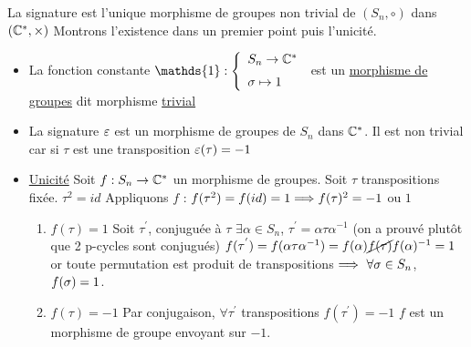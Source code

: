 \documentclass[11pt]{article}
\begin{document}
\begin{corr}{}{}
    La signature est l'unique morphisme de groupes non trivial de $(S_{n}, \circ)$ dans $(\mathbb{C}^{*}, \times)$
    \tcblower
    Montrons l'existence dans un premier point puis l'unicité.
    \begin{itemize}
        \item La fonction constante \n
        $\mathds{1} : \left\{ \begin{array}{ll}
             S_{n} \to \C^{*}  \n
             \s \mapsto 1
        \end{array}\right.$ est un \underline{morphisme de groupes} dit morphisme \underline{trivial}
        \item La signature $\varepsilon$ est un morphisme de groupes de $S_{n}$ dans $\mathbb{C}^{*}$. Il est non trivial car si $\tau$ est une transposition $\varepsilon(\tau) = -1$
        \item \underline{Unicité} Soit $f : S_{n} \to \mathbb{C}^{*}$ un morphisme de groupes.\n
        Soit $\tau$ transpositions fixée. $\tau^{2} = id$\n
        Appliquons $f$ :\n
        $f(\tau^{2}) = f(id) = 1 \Longrightarrow f(\tau)^{2} = -1$ ou $1$
        \begin{enumerate}
            \item $f(\tau) = 1$\n
            Soit $\tau^{'}$, conjuguée à $\tau$\n 
            $\exists \alpha \in S_{n}$, $\tau^{'} = \alpha \tau \alpha^{-1}$ (on a prouvé plutôt que 2 p-cycles sont conjugués)\n
            $f(\tau^{'}) = f(\alpha \tau \alpha^{-1}) = f(\alpha) \cancel{f(\tau)} f(\alpha)^{-1} = 1$\n
            or toute permutation est produit de transpositions $\Longrightarrow ~ \forall \sigma \in S_{n}$, $f(\sigma) = 1$.
            \item $f(\tau) = -1$\n
            Par conjugaison, $\forall \tau^{'}$ transpositions $f(\tau^{'}) = -1$\n
            $f$ est un morphisme de groupe envoyant sur $-1$.
        \end{enumerate}
    \end{itemize}
\end{corr}
\end{document}
